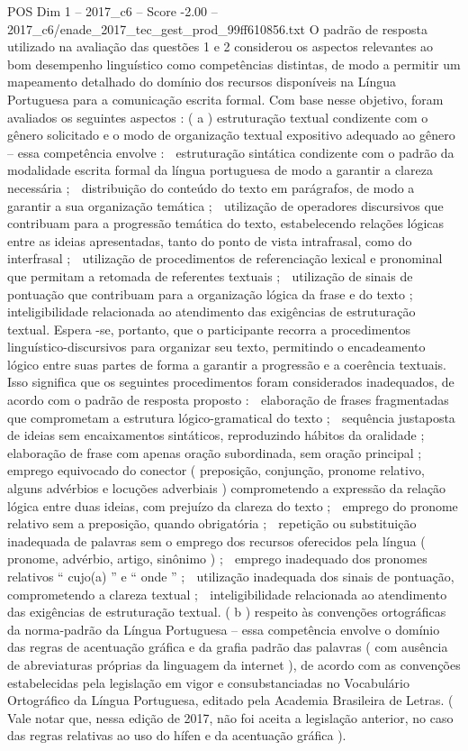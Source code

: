 \begin{textsample}{POS Dim 1 – 2017\_c6 – Score -2.00 – 2017\_c6/enade\_2017\_tec\_gest\_prod\_99ff610856.txt}
O padrão de resposta utilizado na avaliação das questões 1 e 2 considerou os aspectos relevantes ao bom desempenho linguístico como competências distintas, de modo a permitir um mapeamento detalhado do domínio dos recursos disponíveis na Língua Portuguesa para a comunicação escrita formal.
Com base nesse objetivo, foram avaliados os seguintes aspectos : ( a ) estruturação textual condizente com o gênero solicitado e o modo de organização textual expositivo adequado ao gênero – essa competência envolve :  estruturação sintática condizente com o padrão da modalidade escrita formal da língua portuguesa de modo a garantir a clareza necessária ;  distribuição do conteúdo do texto em parágrafos, de modo a garantir a sua organização temática ;  utilização de operadores discursivos que contribuam para a progressão temática do texto, estabelecendo relações lógicas entre as ideias apresentadas, tanto do ponto de vista intrafrasal, como do interfrasal ;  utilização de procedimentos de referenciação lexical e pronominal que permitam a retomada de referentes textuais ;  utilização de sinais de pontuação que contribuam para a organização lógica da frase e do texto ;  inteligibilidade relacionada ao atendimento das exigências de estruturação textual.
Espera -se, portanto, que o participante recorra a procedimentos linguístico-discursivos para organizar seu texto, permitindo o encadeamento lógico entre suas partes de forma a garantir a progressão e a coerência textuais.
Isso significa que os seguintes procedimentos foram considerados inadequados, de acordo com o padrão de resposta proposto :  elaboração de frases fragmentadas que comprometam a estrutura lógico-gramatical do texto ;  sequência justaposta de ideias sem encaixamentos sintáticos, reproduzindo hábitos da oralidade ;  elaboração de frase com apenas oração subordinada, sem oração principal ;  emprego equivocado do conector ( preposição, conjunção, pronome relativo, alguns advérbios e locuções adverbiais ) comprometendo a expressão da relação lógica entre duas ideias, com prejuízo da clareza do texto ;  emprego do pronome relativo sem a preposição, quando obrigatória ;  repetição ou substituição inadequada de palavras sem o emprego dos recursos oferecidos pela língua ( pronome, advérbio, artigo, sinônimo ) ;  emprego inadequado dos pronomes relativos “ cujo(a) ” e “ onde ” ;  utilização inadequada dos sinais de pontuação, comprometendo a clareza textual ;  inteligibilidade relacionada ao atendimento das exigências de estruturação textual. ( b ) respeito às convenções ortográficas da norma-padrão da Língua Portuguesa – essa competência envolve o domínio das regras de acentuação gráfica e da grafia padrão das palavras ( com ausência de abreviaturas próprias da linguagem da internet ), de acordo com as convenções estabelecidas pela legislação em vigor e consubstanciadas no Vocabulário Ortográfico da Língua Portuguesa, editado pela Academia Brasileira de Letras. ( Vale notar que, nessa edição de 2017, não foi aceita a legislação anterior, no caso das regras relativas ao uso do hífen e da acentuação gráfica ).

\end{textsample}
